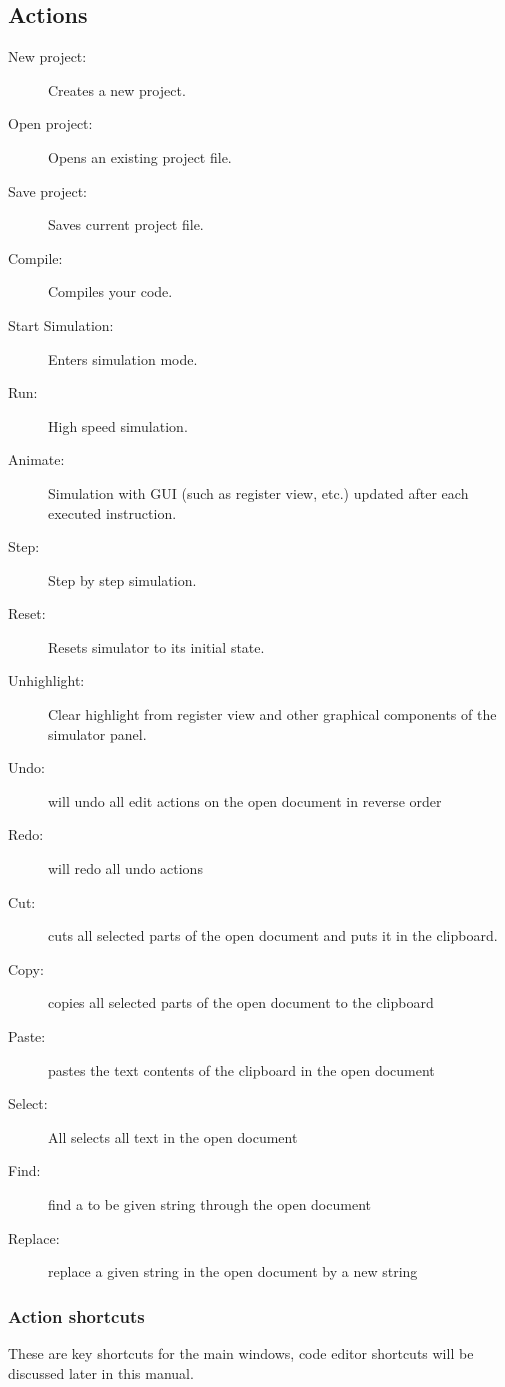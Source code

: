     \clearpage
    \subsection{Actions}
        \begin{description}
            \item [New project:] Creates a new project.
            \item [Open project:] Opens an existing project file.
            \item [Save project:] Saves current project file.
            \item [Compile:] Compiles your code.
            \item [Start Simulation:] Enters simulation mode.
            \item [Run:] High speed simulation.
            \item [Animate:] Simulation with GUI (such as register view, etc.) updated after each executed instruction.
            \item [Step:] Step by step simulation.
            \item [Reset:] Resets simulator to its initial state.
            \item [Unhighlight:] Clear highlight from register view and other graphical components of the simulator panel.
            \item [Undo:] will undo all edit actions on the open document in reverse order
            \item [Redo:] will redo all undo actions
            \item [Cut:] cuts all selected parts of the open document and puts it in the clipboard.
            \item [Copy:] copies all selected parts of the open document to the clipboard
            \item [Paste:] pastes the text contents of the clipboard in the open document
            \item [Select:] All selects all text in the open document
            \item [Find:] find a to be given string through the open document
            \item [Replace:] replace a given string in the open document by a new string
        \end{description}

        \subsubsection{Action shortcuts}
            These are key shortcuts for the main windows, code editor shortcuts will be discussed later in this manual.

